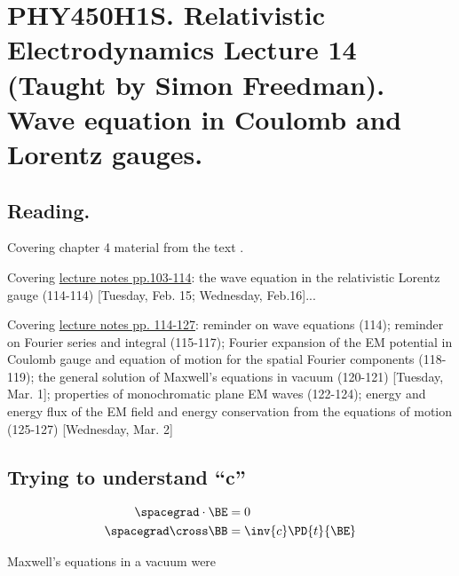 
%

\chapter{PHY450H1S.  Relativistic Electrodynamics Lecture 14 (Taught by Simon Freedman).  Wave equation in Coulomb and Lorentz gauges.}
\label{chap:relativisticElectrodynamicsL14}
{}
\date{Feb 16, 2011}

\beginArtNoToc

\section{Reading.}

Covering chapter 4 material from the text \cite{landau1980classical}.

Covering \href{http://www.physics.utoronto.ca/~poppitz/e-poppitz/PHY450_files/RelEMpp103-114.pdf}{lecture notes pp.103-114}: the wave equation in the relativistic Lorentz gauge (114-114) [Tuesday, Feb. 15; Wednesday, Feb.16]...

Covering \href{http://www.physics.utoronto.ca/~poppitz/e-poppitz/PHY450_files/RelEMpp114-127.pdf}{lecture notes pp. 114-127}: reminder on wave equations (114); reminder on Fourier series and integral (115-117); Fourier expansion of the EM potential in Coulomb gauge and equation of motion for the spatial Fourier components (118-119); the general solution of Maxwell's equations in vacuum (120-121) [Tuesday, Mar. 1]; properties of monochromatic plane EM waves (122-124); energy and energy flux of the EM field and energy conservation from the equations of motion (125-127)  [Wednesday, Mar. 2]

\section{Trying to understand ``c''}

\begin{align}\label{eqn:relativisticElectrodynamicsL14:10}
\spacegrad \cdot \BE &= 0 \\
\spacegrad \cross \BB &= \inv{c} \PD{t}{\BE}
\end{align}

Maxwell's equations in a vacuum were

